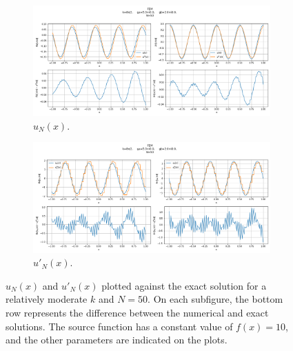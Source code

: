 \begin{figure}[h!]
    \centering
    \begin{subfigure}[b]{0.7\textwidth}
        \includegraphics[width=\textwidth]{img/FEM-Const-MidFreq-N0050-sol.png}
        \caption{$u_N(x)$.}
    \end{subfigure}
    \vfill
    \begin{subfigure}[b]{0.7\textwidth}
        \includegraphics[width=\textwidth]{img/FEM-Const-MidFreq-N0050-der.png}
        \caption{$u'_N(x)$.}
    \end{subfigure}
    \caption{$u_N(x)$ and $u'_N(x)$ plotted against the exact solution for a relatively moderate $k$ and $N=50$. On each subfigure, the bottom row represents the difference between the numerical and exact solutions. The source function has a constant value of $f(x)=10$, and the other parameters are indicated on the plots.}
    \label{fig:femMidfreqN050}
\end{figure}

